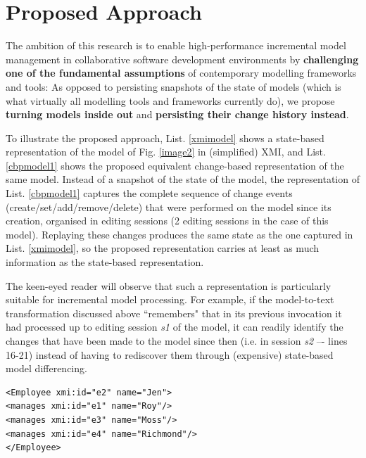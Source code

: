 \documentclass{llncs}
\begin{document}
\section{Proposed Approach}
\label{Proposed Approach}
The ambition of this research is to enable high-performance incremental model management in collaborative software development environments by \textbf{challenging one of the fundamental assumptions} of contemporary modelling frameworks and tools: As opposed to persisting snapshots of the state of models (which is what virtually all modelling tools and frameworks currently do), we propose \textbf{turning models inside out} and \textbf{persisting their change history instead}.

To illustrate the proposed approach, List. \ref{xmimodel} shows a state-based representation of the model of Fig. \ref{image2} in (simplified) XMI, and List. \ref{cbpmodel1} shows the proposed equivalent change-based representation of the same model. Instead of a snapshot of the state of the model, the representation of List. \ref{cbpmodel1} captures the complete sequence of change events (create/set/add/remove/delete) that were performed on the model since its creation, organised in editing sessions (2 editing sessions in the case of this model). Replaying these changes produces the same state as the one captured in List. \ref{xmimodel}, so the proposed representation carries at least as much information as the state-based representation.

The keen-eyed reader will observe that such a representation is particularly suitable for incremental model processing. For example, if the model-to-text transformation discussed above ``remembers" that in its previous invocation it had processed up to editing session \emph{s1} of the model, it can readily identify the changes that have been made to the model since then (i.e. in session \emph{s2} –- lines 16-21) instead of having to rediscover them through (expensive) state-based model differencing.

\begin{lstlisting}[style=xmi,caption={State-based representation of the model of Figure \ref{image2} in (simplified) XMI.},label=xmimodel]
<Employee xmi:id="e2" name="Jen">
<manages xmi:id="e1" name="Roy"/>
<manages xmi:id="e3" name="Moss"/>
<manages xmi:id="e4" name="Richmond"/>
</Employee>
\end{lstlisting}
\end{document}
